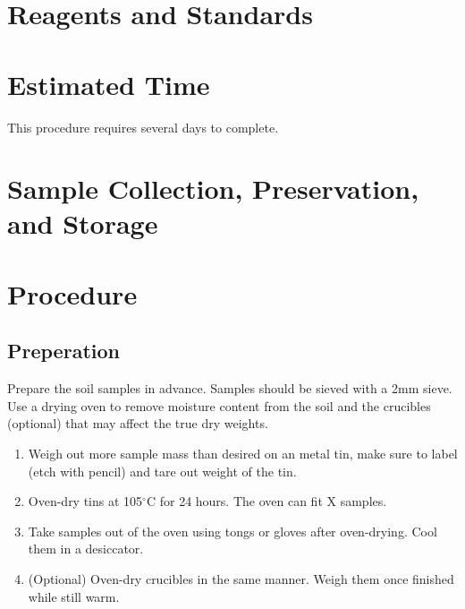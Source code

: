 \documentclass[12pt]{../SOP4_alpha}\usepackage[]{graphicx}\usepackage[]{xcolor}
\begin{document}
\section{Reagents and Standards}


\section{Estimated Time}

\NP This procedure requires several days to complete.


\section{Sample Collection, Preservation, and Storage}



\section{Procedure}

\subsection{Preperation}

\NP Prepare the soil samples in advance. Samples should be sieved with a 2mm sieve.
  Use a drying oven to remove moisture content from the soil and the crucibles (optional) that may affect the true dry weights.  
  
  \begin{enumerate}
	  \item Weigh out more sample mass than desired on an metal tin, make sure to label (etch with pencil) and tare out weight of the tin. %
	  \item Oven-dry tins at 105$^\circ$C for 24 hours. The oven can fit X samples.
	  \item Take samples out of the oven using tongs or gloves after oven-drying. Cool them in a desiccator.
	  \item (Optional) Oven-dry crucibles in the same manner. Weigh them once finished while still warm.  
	\end{enumerate}
	
\end{document}
